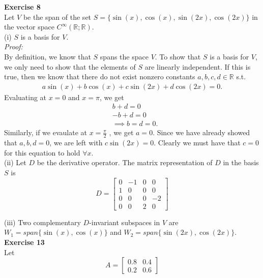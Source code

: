 \documentclass[letterpaper,12pt]{article}
\theoremstyle{definition}
\begin{document}
\textbf{Exercise 8} \\
Let $V$ be the span of the set $S = \{\sin(x), \cos(x), \sin(2x), \cos(2x)\}$ in the vector space $C^\infty(\mathbb{R;R})$. \\
(i) $S$ is a basis for $V$. \\
\textit{Proof:} \\
By definition, we know that $S$ spans the space $V$. To show that $S$ is a basis for $V$, we only need to show that the elements of $S$ are linearly independent. If this is true, then we know that there do not exist nonzero constants $a, b, c, d \in \mathbb{R}$ s.t.
\begin{align*}
  a \sin(x) + b \cos(x) + c \sin(2x) + d \cos(2x) = 0.
\end{align*}
Evaluating at $x=0$ and $x=\pi$, we get
\begin{align*}
  & b + d = 0 \\
  & -b + d = 0 \\
  & \implies b = d = 0.
\end{align*}
Similarly, if we evaulate at $x=\frac{\pi}{2}$ , we get $a = 0$. Since we have already showed that $a,b,d=0$, we are left with $c \sin(2x) = 0$. Clearly we must have that $c=0$ for this equation to hold $\forall x$. \\

(ii) Let $D$ be the derivative operator. The matrix representation of $D$ in the basis $S$ is
\[ D =
\begin{bmatrix}
  0 & -1 & 0 & 0 \\
  1 & 0 & 0 & 0 \\
  0 & 0 & 0 & -2 \\
  0 & 0 & 2 & 0
\end{bmatrix}
\]

(iii) Two complementary $D$-invariant subspaces in $V$ are $W_1 = span\{\sin(x), \cos(x)\}$ and $W_2 = span\{\sin(2x), \cos(2x)\}$. \\

\textbf{Exercise 13} \\
Let
\[ A =
\begin{bmatrix}
  0.8 & 0.4 \\
  0.2 & 0.6
\end{bmatrix}
\]
\end{document}
